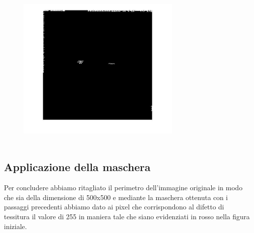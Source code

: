 \documentclass[a4paper]{article}
\begin{document}
    \begin{figure}[H]
        \centering
        \includegraphics[width=8cm,height=8cm,keepaspectratio]{maschera_terminata.jpg}
    \end{figure}
    
    
    \vspace{0.5cm}
    \subsection{Applicazione della maschera}
    
    \setlength{\baselineskip}{0.8cm}
    {\vspace{0.5cm}\fontsize{6mm}{6mm}\selectfont Per concludere abbiamo ritagliato il perimetro dell'immagine originale in modo che sia della dimensione di 500x500 e mediante la maschera ottenuta con i passaggi precedenti abbiamo dato ai pixel che corrispondono al difetto di tessitura il valore di 255 in maniera tale che siano evidenziati in rosso nella figura iniziale. }
    
\end{document}
